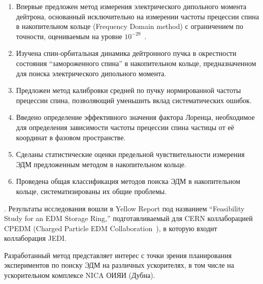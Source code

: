 {\novelty}
\begin{enumerate}
	\item Впервые предложен метод измерения электрического дипольного момента дейтрона,
	 основанный исключительно на измерении частоты прецессии спина в накопительном кольце 
	 (Frequency Domain method) с ограничением по точности, оцениваемым на уровне $10^{-29}$~\ecm.
	\item Изучена спин-орбитальная динамика дейтронного пучка в окрестности состояния ``замороженного спина''
	в накопительном кольце, предназначенном для поиска электрического дипольного момента. 
	\item Предложен метод калибровки средней по пучку нормированной частоты прецессии спина, позволяющий уменьшить вклад систематических ошибок.
	\item Введено определение эффективного значения фактора Лоренца, необходимое для 
	определения зависимости частоты прецессии спина частицы от её координат в фазовом пространстве. 
	\item Сделаны статистические оценки предельной чувствительности измерения ЭДМ предложенным методом в накопительном кольце. 
	\item Проведена общая классификация методов поиска ЭДМ в накопительном кольце, систематизированы их общие проблемы.
\end{enumerate}

{\influence}. Результаты исследования вошли в Yellow Report под названием 
``Feasibility Study for an EDM Storage Ring,'' подготавливаемый для CERN коллаборацией CPEDM 
(Charged Particle EDM Collaboration~\cite{CPEDM:Website}), в которую входит коллаборация JEDI.




Разработанный метод представляет интерес с точки зрения планирования экспериментов по поиску ЭДМ
 на различных ускорителях, в том числе на ускорительном комплексе NICA ОИЯИ (Дубна).

